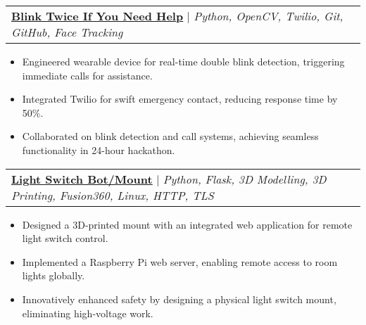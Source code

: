 \documentclass[letterpaper]{article}
\makeatletter
\newcommand{\resumeItem}[1]{
  \item\small{
    {#1 \vspace{-2pt}}
  }
}
\newcommand{\resumeProjectHeading}[2]{
    \item
    \begin{tabular*}{0.97\textwidth}{l@{\extracolsep{\fill}}r}
      \small#1 & #2 \\
    \end{tabular*}\vspace{-7pt}
}
\newcommand{\resumeProjectHeadingWithDetails}[4]{
    \item
    \begin{tabular*}{0.97\textwidth}{l@{\extracolsep{\fill}}r}
      \small#1 & #2 \\[5pt] %
      \textit{\small#3} & \textit{\small #4} \\
    \end{tabular*}\vspace{-7pt}
}
\newcommand{\resumeItemListStart}{\begin{itemize}}
\newcommand{\resumeItemListEnd}{\end{itemize}\vspace{-5pt}}
\makeatother
\begin{document}
      \resumeProjectHeading
          {\textbf{\underline{\href{https://github.com/ransomw/the-benevolent-dictators}{Blink Twice If You Need Help}}} $|$ \emph{Python, OpenCV, Twilio, Git, GitHub, Face Tracking}}{}
          \resumeItemListStart
            \resumeItem{Engineered wearable device for real-time double blink detection, triggering immediate calls for assistance.}
            \resumeItem{Integrated Twilio for swift emergency contact, reducing response time by 50\%.}
            \resumeItem{Collaborated on blink detection and call systems, achieving seamless functionality in 24-hour hackathon.}
          \resumeItemListEnd    



    
      \resumeProjectHeading
          {\textbf{\underline{\href{https://www.gavintranquilino.com/light-switch.html}{Light Switch Bot/Mount}}} $|$ \emph{Python, Flask, 3D Modelling, 3D Printing, Fusion360, Linux, HTTP, TLS}}{}
          \resumeItemListStart
            \resumeItem{Designed a 3D-printed mount with an integrated web application for remote light switch control.}
            \resumeItem{Implemented a Raspberry Pi web server, enabling remote access to room lights globally.}
            \resumeItem{Innovatively enhanced safety by designing a physical light switch mount, eliminating high-voltage work.}
          \resumeItemListEnd
\end{document}
